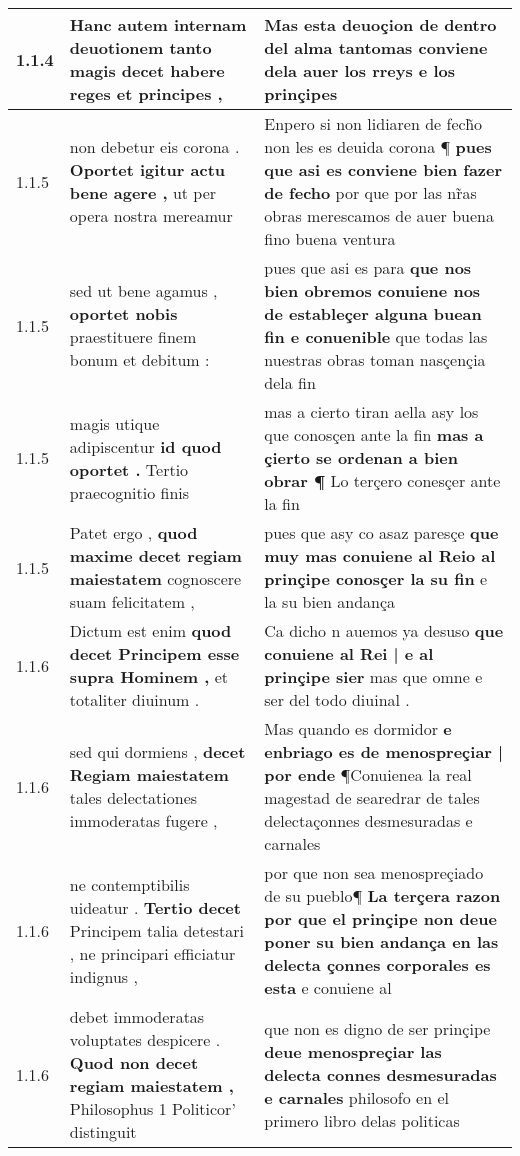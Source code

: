 \begin{tabular}{|p{1cm}|p{6.5cm}|p{6.5cm}|}
1.1.4 & Hanc autem internam deuotionem \textbf{ tanto magis decet } habere reges et principes , & Mas esta deuoçion de dentro del alma \textbf{ tantomas conviene dela auer los rreys } e los prinçipes \\\hline
1.1.5 & non debetur eis corona . \textbf{ Oportet igitur actu bene agere , } ut per opera nostra mereamur & Enpero si non lidiaren de fech̃o non les es deuida corona ¶ \textbf{ pues que asi es conviene bien fazer de fecho } por que por las nr̃as obras merescamos de auer buena fino buena ventura \\\hline
1.1.5 & sed ut bene agamus , \textbf{ oportet nobis } praestituere finem bonum et debitum : & pues que asi es para \textbf{ que nos bien obremos conuiene nos de estableçer alguna buean fin e conuenible } que todas las nuestras obras toman nasçençia dela fin \\\hline
1.1.5 & magis utique adipiscentur \textbf{ id quod oportet . } Tertio praecognitio finis & mas a cierto tiran aella asy los que conosçen ante la fin \textbf{ mas a çierto se ordenan a bien obrar ¶ } Lo terçero conesçer ante la fin \\\hline
1.1.5 & Patet ergo , \textbf{ quod maxime decet regiam maiestatem } cognoscere suam felicitatem , & pues que asy co asaz paresçe \textbf{ que muy mas conuiene al Reio al prinçipe conosçer la su fin } e la su bien andança \\\hline
1.1.6 & Dictum est enim \textbf{ quod decet Principem esse supra Hominem , } et totaliter diuinum . & Ca dicho n auemos ya desuso \textbf{ que conuiene al Rei | e al prinçipe sier } mas que omne e ser del todo diuinal . \\\hline
1.1.6 & sed qui dormiens , \textbf{ decet Regiam maiestatem } tales delectationes immoderatas fugere , & Mas quando es dormidor \textbf{ e enbriago es de menospreçiar | por ende } ¶Conuienea la real magestad de searedrar de tales delectaçonnes desmesuradas e carnales \\\hline
1.1.6 & ne contemptibilis uideatur . \textbf{ Tertio decet } Principem talia detestari , ne principari efficiatur indignus , & por que non sea menospreçiado de su pueblo¶ \textbf{ La terçera razon por que el prinçipe non deue poner su bien andança en las delecta çonnes corporales es esta } e conuiene al \\\hline
1.1.6 & debet immoderatas voluptates despicere . \textbf{ Quod non decet regiam maiestatem , } Philosophus 1 Politicor’ distinguit & que non es digno de ser prinçipe \textbf{ deue menospreçiar las delecta connes desmesuradas e carnales } philosofo en el primero libro delas politicas \\\hline

\end{tabular}
